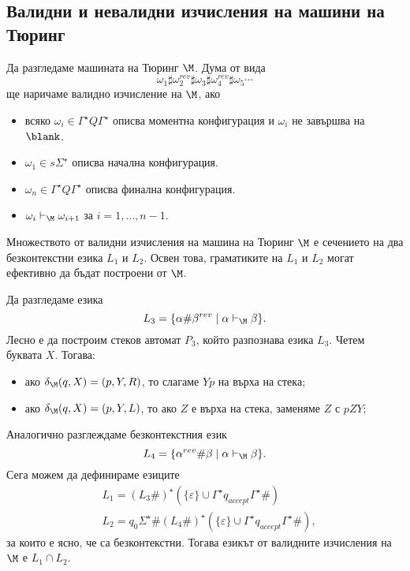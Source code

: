 \subsection*{Валидни и невалидни изчисления на машини на Тюринг}
Да разгледаме машината на Тюринг $\M$.
Дума от вида 
\[\omega_1 \sharp \omega^{rev}_2 \sharp \omega_3 \sharp \omega^{rev}_4\sharp\omega_5\cdots\]
ще наричаме валидно изчисление на $\M$, ако 
\begin{itemize}
\item
  всяко $\omega_i \in \Gamma^\star Q \Gamma^\star$ описва моментна конфигурация
  и $\omega_i$ не завършва на $\blank$.
\item
  $\omega_1 \in s\Sigma^\star$ описва начална конфигурация.
\item
  $\omega_n \in \Gamma^\star Q \Gamma^\star$ описва финална конфигурация.
\item 
  $\omega_i \vdash_\M \omega_{i+1}$ за $i = 1,\dots,n-1$.
\end{itemize}



\begin{lemma}
  Множеството от валидни изчисления на машина на Тюринг $\M$ е сечението на два безконтекстни езика $L_1$ и $L_2$.
  Освен това, граматиките на $L_1$ и $L_2$ могат ефективно да бъдат построени от $\M$.
\end{lemma}
\begin{hint}
  Да разгледаме езика
  \[L_3 = \{\alpha\#\beta^{rev} \mid \alpha \vdash_\M \beta\}.\]
  Лесно е да построим стеков автомат $P_3$, който разпознава езика $L_3$.
  Четем буквата $X$. Тогава:
  \begin{itemize}
  \item 
    ако $\delta_\M(q,X) =(p,Y,R)$, то слагаме $Yp$ на върха на стека;
  \item
    ако $\delta_\M(q,X) =(p,Y,L)$, то ако $Z$ е върха на стека, заменяме $Z$ с $pZY$;
  \end{itemize}
  Аналогично разглеждаме безконтекстния език
  \[L_4 = \{\alpha^{rev}\#\beta \mid \alpha \vdash_\M \beta\}.\]
  Сега можем да дефинираме езиците
  \begin{align*}
    & L_1 = (L_3\#)^\star(\{\varepsilon\}\cup \Gamma^\star q_{accept} \Gamma^\star\#)\\
    & L_2 = q_0\Sigma^\star \# (L_4\#)^\star(\{\varepsilon\}\cup \Gamma^\star q_{accept} \Gamma^\star\#),
  \end{align*}
  за които е ясно, че са безконтекстни.
  Тогава езикът от валидните изчисления на $\M$
  е $L_1 \cap L_2$.
\end{hint}

